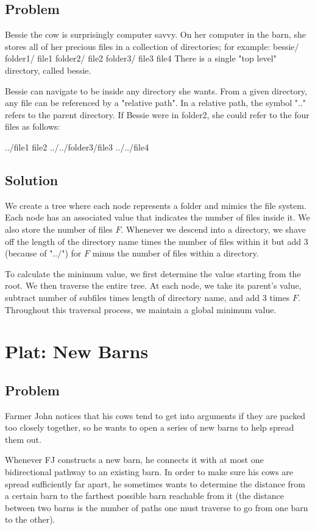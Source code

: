 \documentclass[11pt]{article}
\begin{document}
\subsection{Problem}
Bessie the cow is surprisingly computer savvy. On her computer in the barn, she stores all of her precious files in a collection of directories; for example:
bessie/
  folder1/
    file1
    folder2/
      file2
  folder3/
    file3
  file4
There is a single "top level" directory, called bessie.

Bessie can navigate to be inside any directory she wants. From a given directory, any file can be referenced by a "relative path". In a relative path, the symbol ".." refers to the parent directory. If Bessie were in folder2, she could refer to the four files as follows:

../file1
file2
../../folder3/file3
../../file4

\subsection{Solution}
We create a tree where each node represents a folder and mimics the file system. Each node has an associated value that indicates the number of files inside it. We also store the number of files $F$. Whenever we descend into a directory, we shave off the length of the directory name times the number of files within it but add 3 (because of "../") for $F$ minus the number of files within a directory. 

To calculate the minimum value, we first determine the value starting from the root. We then traverse the entire tree. At each node, we take its parent's value, subtract number of subfiles times length of directory name, and add 3 times $F$. Throughout this traversal process, we maintain a global minimum value.

\section{Plat: New Barns}

\subsection{Problem}

Farmer John notices that his cows tend to get into arguments if they are packed too closely together, so he wants to open a series of new barns to help spread them out.

Whenever FJ constructs a new barn, he connects it with at most one bidirectional pathway to an existing barn. In order to make sure his cows are spread sufficiently far apart, he sometimes wants to determine the distance from a certain barn to the farthest possible barn reachable from it (the distance between two barns is the number of paths one must traverse to go from one barn to the other).
\end{document}
